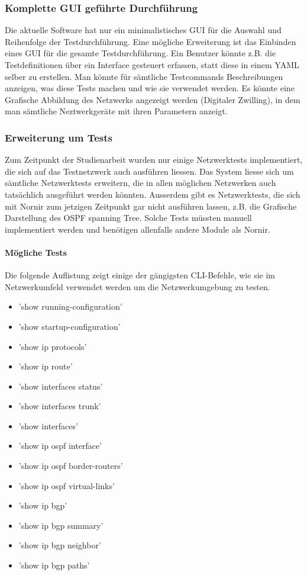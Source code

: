 \documentclass[]{subfiles}
\begin{document}
\subsubsection*{Komplette GUI geführte Durchführung}
Die aktuelle Software hat nur ein minimalistisches GUI für die Auswahl und Reihenfolge
der Testdurchführung. 
Eine mögliche Erweiterung ist das Einbinden eines GUI für die gesamte Testdurchführung.
Ein Benutzer könnte z.B. die Testdefinitionen über ein Interface gesteuert erfassen, 
statt diese in einem YAML selber zu erstellen. 
Man könnte für sämtliche Testcommands Beschreibungen anzeigen, was diese Tests machen
und wie sie verwendet werden. 
Es könnte eine Grafische Abbildung des Netzwerks angezeigt werden (Digitaler Zwilling), 
in dem man sämtliche Neztwerkgeräte mit ihren Parametern anzeigt. 

\subsubsection*{Erweiterung um Tests}
Zum Zeitpunkt der Studienarbeit wurden nur einige Netzwerktests implementiert, die 
sich auf das Testnetzwerk auch ausführen liessen. 
Das System liesse sich um sämtliche Netzwerktests erweitern, die in allen möglichen 
Netzwerken auch tatsächlich ausgeführt werden könnten.
Ausserdem gibt es Netzwerktests, die sich mit Nornir zum jetzigen Zeitpunkt gar nicht
ausführen lassen, z.B. die Grafische Darstellung des OSPF spanning Tree. 
Solche Tests müssten manuell implementiert werden und benötigen allenfalls andere 
Module als Nornir.

\paragraph{Mögliche Tests}
Die folgende Auflistung zeigt einige der gängigsten CLI-Befehle, wie sie im Netzwerkumfeld
verwendet werden um die Netzwerkumgebung zu testen. 

\begin{itemize}
    \item 'show running-configuration'
    \item 'show startup-configuration'
    \item 'show ip protocols'
    \item 'show ip route'
    \item 'show interfaces status'
    \item 'show interfaces trunk'
    \item 'show interfaces'
    \item 'show ip ospf interface'
    \item 'show ip ospf border-routers'
    \item 'show ip ospf virtual-links'
    \item 'show ip bgp'
    \item 'show ip bgp summary'
    \item 'show ip bgp neighbor'
    \item 'show ip bgp paths'
\end{itemize}
\end{document}
